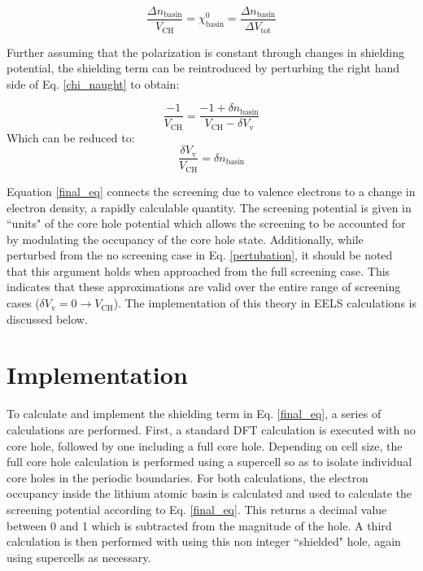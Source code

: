 \begin{equation}
\frac{\Delta n _{\mathrm{basin}}}{V_{\mathrm{CH}}} = \chi^0_{\mathrm{basin}} = \frac{\Delta n _{\mathrm{basin}}}{\Delta V_{\mathrm{tot}}}
\label{chi_naught}
\end{equation}

Further assuming that the polarization is constant through changes in shielding potential, the shielding term can be reintroduced by perturbing the right hand side of Eq. \ref{chi_naught} to obtain: 


\begin{equation}
\frac{-1}{V_{\mathrm{CH}}} = \frac{-1+\delta n_{\mathrm{basin}}}{V_{\mathrm{CH}}-\delta V_{\mathrm{v}}}
\label{pertubation}
\end{equation}
Which can be reduced to:
\begin{equation}
\frac{\delta V_{\mathrm{v}}}{V_{\mathrm{CH}}} = \delta n_{\mathrm{basin}}
\label{final_eq}
\end{equation}

Equation \ref{final_eq} connects the screening due to valence electrons to a change in electron density, a rapidly calculable quantity.  The screening potential is given in ``units" of the core hole potential which allows the screening to be accounted for by modulating the occupancy of the core hole state.  Additionally, while perturbed from the no screening case in Eq. \ref{pertubation}, it should be noted that this argument holds when approached from the full screening case.  This indicates that these approximations are valid over the entire range of screening cases ($\delta V_{\mathrm{v}} = 0 \to V_{\mathrm{CH}}$).  The implementation of this theory in EELS calculations is discussed below.  

\section{Implementation} \label{implementation}
To calculate and implement the shielding term in Eq. \ref{final_eq}, a series of calculations are performed.  First, a standard DFT calculation is executed with no core hole, followed by one including a full core hole. Depending on cell size, the full core hole calculation is performed using a supercell so as to isolate individual core holes in the periodic boundaries. For both calculations, the electron occupancy inside the lithium atomic basin is calculated and used to calculate the screening potential according to Eq. \ref{final_eq}.  This returns a decimal value between 0 and 1 which is subtracted from the magnitude of the hole.  A third calculation is then performed with using this non integer ``shielded" hole, again using supercells as necessary.  

